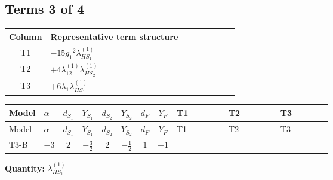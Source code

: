 \documentclass[8pt]{article}
\begin{document}
\begin{landscape}
\subsection*{Terms 3 of 4}
\begin{center}
\begin{tabular}{@{}c >{\raggedright\arraybackslash}p{0.82\linewidth}@{}}
\toprule
Column & Representative term structure \\
\midrule
T1 & \(\displaystyle -15 {g_1}^2 {\lambda_{HS_1}^{(1)}}\) \\
\midrule
T2 & \(\displaystyle +4 {\lambda_{12}^{(1)}} {\lambda_{HS_2}^{(1)}}\) \\
\midrule
T3 & \(\displaystyle +6 {\lambda_1} {\lambda_{HS_1}^{(1)}}\) \\
\midrule
\bottomrule
\end{tabular}
\end{center}
\smallskip
\tiny
\begin{longtable}{@{}llcccccc >{\raggedright\arraybackslash}p{0.21\linewidth} >{\raggedright\arraybackslash}p{0.21\linewidth} >{\raggedright\arraybackslash}p{0.21\linewidth}@{}}
\toprule
Model & $\alpha$ & $d_{S_1}$ & $Y_{S_1}$ & $d_{S_2}$ & $Y_{S_2}$ & $d_F$ & $Y_F$ & T1 & T2 & T3 \\
\midrule
\endfirsthead
\toprule
Model & $\alpha$ & $d_{S_1}$ & $Y_{S_1}$ & $d_{S_2}$ & $Y_{S_2}$ & $d_F$ & $Y_F$ & T1 & T2 & T3 \\
\midrule
\endhead
T3-B & $-3$ & $2$ & $-\frac{3}{2}$ & $2$ & $-\frac{1}{2}$ & $1$ & $-1$ & \scriptsize\adjustbox{max width=\linewidth}{$\begin{gathered} -15 {g_1}^2 {\lambda_{HS_1}^{(1)}}\end{gathered}$} & \scriptsize\adjustbox{max width=\linewidth}{$\begin{gathered} +4 {\lambda_{12}^{(1)}} {\lambda_{HS_2}^{(1)}}\end{gathered}$} & \scriptsize\adjustbox{max width=\linewidth}{$\begin{gathered} +6 {\lambda_1} {\lambda_{HS_1}^{(1)}}\end{gathered}$} \\
\midrule
\bottomrule
\end{longtable}
\clearpage
\noindent\textbf{Quantity: }$\lambda_{HS_1}^{(1)}$\par\smallskip

\end{landscape}
\end{document}
